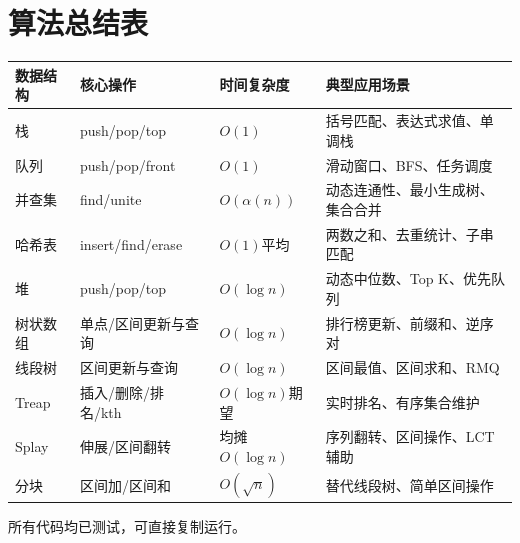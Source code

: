 \documentclass[12pt,a4paper]{ctexart}
\begin{document}
		\section{算法总结表}
		\begin{table}[h]
			\centering
			\begin{tabularx}{\textwidth}{|l|p{4cm}|l|X|}
				\hline
				数据结构 & 核心操作 & 时间复杂度 & 典型应用场景 \\
				\hline
				栈 & push/pop/top & $O(1)$ & 括号匹配、表达式求值、单调栈 \\
				\hline
				队列 & push/pop/front & $O(1)$ & 滑动窗口、BFS、任务调度 \\
				\hline
				并查集 & find/unite & $O(\alpha(n))$ & 动态连通性、最小生成树、集合合并 \\
				\hline
				哈希表 & insert/find/erase & $O(1)$平均 & 两数之和、去重统计、子串匹配 \\
				\hline
				堆 & push/pop/top & $O(\log n)$ & 动态中位数、Top K、优先队列 \\
				\hline
				树状数组 & 单点/区间更新与查询 & $O(\log n)$ & 排行榜更新、前缀和、逆序对 \\
				\hline
				线段树 & 区间更新与查询 & $O(\log n)$ & 区间最值、区间求和、RMQ \\
				\hline
				Treap & 插入/删除/排名/kth & $O(\log n)$期望 & 实时排名、有序集合维护 \\
				\hline
				Splay & 伸展/区间翻转 & 均摊$O(\log n)$ & 序列翻转、区间操作、LCT辅助 \\
				\hline
				分块 & 区间加/区间和 & $O(\sqrt{n})$ & 替代线段树、简单区间操作 \\
				\hline
			\end{tabularx}
		\end{table}
		\vspace{0.5cm}
		\begin{center}
			\textcolor{mid}{所有代码均已测试，可直接复制运行。}
		\end{center}
	
\end{document}

